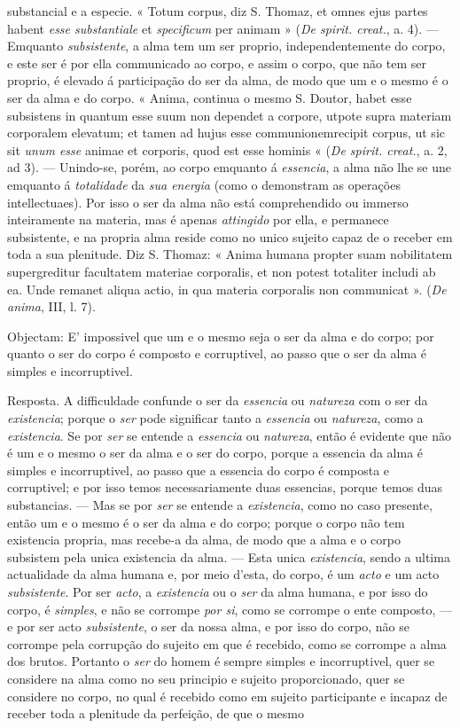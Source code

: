 substancial e a especie. « Totum corpus, diz S. Thomaz, et omnes ejus partes habent \emph{esse substantiale} et \emph{specificum} per animam » (\emph{De spirit. creat.}, a. 4). --- Emquanto \emph{subsistente}, a alma tem um ser proprio, independentemente do corpo, e este ser é por ella communicado ao corpo, e assim o corpo, que não tem ser proprio, é elevado á participação do ser da alma, de modo que um e o mesmo é o ser da alma e do corpo. « Anima, continua o mesmo S. Doutor, habet esse subsistens in quantum esse suum non dependet a corpore, utpote supra materiam corporalem elevatum; et tamen ad hujus esse communionemrecipit corpus, ut sic sit \emph{unum esse} animae et corporis, quod est esse hominis « (\emph{De spirit. creat.}, a. 2, ad 3). --- Unindo-se, porém, ao corpo emquanto á \emph{essencia}, a alma não lhe se une emquanto á \emph{totalidade} da \emph{sua energia} (como o demonstram as operações intellectuaes). Por isso o ser da alma não está comprehendido ou immerso inteiramente na materia, mas é apenas \emph{attingido} por ella, e permanece subsistente, e na propria alma reside como no unico sujeito capaz de o receber em toda a sua plenitude. Diz S. Thomaz: « Anima humana propter suam nobilitatem supergreditur facultatem materiae corporalis, et non potest totaliter includi ab ea. Unde remanet aliqua actio, in qua materia corporalis non communicat ». (\emph{De anima}, III, l. 7).\par Objectam: E' impossivel que um e o mesmo seja o ser da alma e do corpo; por quanto o ser do corpo é composto e corruptivel, ao passo que o ser da alma é simples e incorruptivel.\par Resposta. A difficuldade confunde o ser da \emph{essencia} ou \emph{natureza} com o ser da \emph{existencia}; porque o \emph{ser} pode significar tanto a \emph{essencia} ou \emph{natureza}, como a \emph{existencia}. Se por \emph{ser} se entende a \emph{essencia} ou \emph{natureza}, então é evidente que não é um e o mesmo o ser da alma e o ser do corpo, porque a essencia da alma é simples e incorruptivel, ao passo que a essencia do corpo é composta e corruptivel; e por isso temos necessariamente duas essencias, porque temos duas substancias. --- Mas se por \emph{ser} se entende a \emph{existencia}, como no caso presente, então um e o mesmo é o ser da alma e do corpo; porque o corpo não tem existencia propria, mas recebe-a da alma, de modo que a alma e o corpo subsistem pela unica existencia da alma. --- Esta unica \emph{existencia}, sendo a ultima actualidade da alma humana e, por meio d'esta, do corpo, é um \emph{acto} e um acto \emph{subsistente}. Por ser \emph{acto}, a \emph{existencia} ou o \emph{ser} da alma humana, e por isso do corpo, é \emph{simples}, e não se corrompe \emph{por si}, como se corrompe o ente composto, --- e por ser acto \emph{subsistente}, o ser da nossa alma, e por isso do corpo, não se corrompe pela corrupção do sujeito em que é recebido, como se corrompe a alma dos brutos. Portanto o \emph{ser} do homem é sempre simples e incorruptivel, quer se considere na alma como no seu principio e sujeito proporcionado, quer se considere no corpo, no qual é recebido como em sujeito participante e incapaz de receber toda a plenitude da perfeição, de que o mesmo 